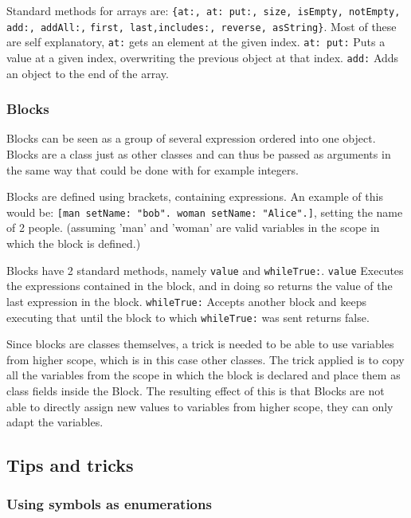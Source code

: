 \documentclass[a4paper]{article}
\begin{document}
Standard methods for arrays are:
\verb|{at:, at: put:, size, isEmpty, notEmpty, add:, addAll:,|
\verb|first, last,includes:, reverse, asString}|. Most of these are self explanatory, \verb|at:| gets an element at the given index. \verb|at: put:| Puts a value at a given index, overwriting the previous object at that index. \verb|add:| Adds an object to the end of the array.


\subsubsection{Blocks}

Blocks can be seen as a group of several expression ordered into one object. Blocks are a class just as other classes and can thus be passed as arguments in the same way that could be done with for example integers.

Blocks are defined using brackets, containing expressions. An example of this would be:
\verb|[man setName: "bob". woman setName: "Alice".]|, setting the name of 2 people. (assuming 'man' and 'woman' are valid variables in the scope in which the block is defined.)

Blocks have 2 standard methods, namely \verb|value| and \verb|whileTrue:|. \verb|value| Executes the expressions contained in the block, and in doing so returns the value of the last expression in the block. \verb|whileTrue:| Accepts another block and keeps executing that until the block to which \verb|whileTrue:| was sent returns false.

Since blocks are classes themselves, a trick is needed to be able to use variables from higher scope, which is in this case other classes. The trick applied is to copy all the variables from the scope in which the block is declared and place them as class fields inside the Block. The resulting effect of this is that Blocks are not able to directly assign new values to variables from higher scope, they can only adapt the variables.



\subsection{Tips and tricks}

\subsubsection{Using symbols as enumerations}
\end{document}
